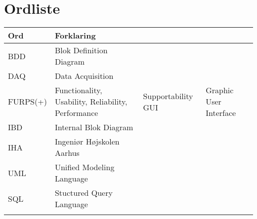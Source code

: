 \chapter{Ordliste}

\begin{longtabu} to 
    Ord &    Forklaring\\
    \toprule 
    BDD & Blok Definition Diagram \\	    
    DAQ & Data Acquisition\\
    FURPS(+) & Functionality, Usability, Reliability, Performance & Supportability
	GUI & Graphic User Interface\\
	IBD & Internal Blok Diagram\\
	IHA & Ingeniør Højskolen Aarhus\\
	UML & Unified Modeling Language\\
	SQL & Stuctured Query Language\\
	
\label{forkort}
\end{longtabu}